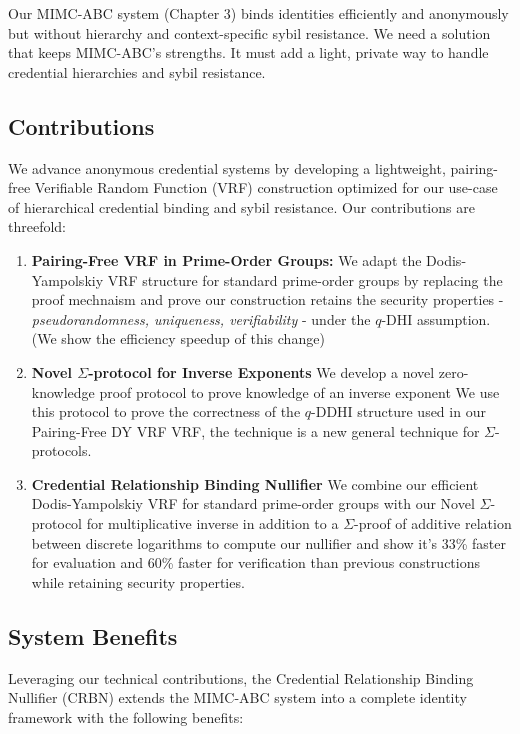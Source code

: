 Our MIMC-ABC system (Chapter 3) binds identities efficiently and anonymously but without hierarchy and context-specific sybil resistance. We need a solution that keeps MIMC-ABC’s strengths. It must add a light, private way to handle credential hierarchies and sybil resistance.




\subsection{Contributions}

We advance anonymous credential systems by developing a lightweight, pairing-free Verifiable Random Function (VRF) construction optimized for our use-case of hierarchical credential binding and sybil resistance. Our contributions are threefold:

\begin{enumerate}
        \item \textbf{Pairing-Free VRF in Prime-Order Groups:} We adapt the Dodis-Yampolskiy VRF structure for standard prime-order groups by replacing the proof mechnaism and prove our construction retains the security properties - \emph{pseudorandomness, uniqueness, verifiability} - under the $q$-DHI assumption. (We show the efficiency speedup of this change)

        \item \textbf{Novel $\Sigma$-protocol for Inverse Exponents} We develop a novel zero-knowledge proof protocol to prove knowledge of an inverse exponent We use this protocol to prove the correctness of the $q$-DDHI structure used in our Pairing-Free DY VRF VRF, the technique is a new general technique for $\Sigma$-protocols.
        
        \item \textbf{Credential Relationship Binding Nullifier } We combine our efficient Dodis-Yampolskiy VRF for standard prime-order groups with our Novel $\Sigma$-protocol for multiplicative inverse in addition to a $\Sigma$-proof of additive relation between discrete logarithms to compute our nullifier and show it's 33\% faster for evaluation and 60\% faster for verification than previous constructions while retaining security properties.

\end{enumerate}


\subsection{System Benefits}
Leveraging our technical contributions, the Credential Relationship Binding Nullifier (CRBN) extends the MIMC-ABC system into a complete identity framework with the following benefits:

